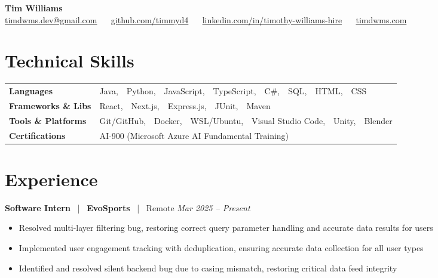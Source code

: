 \documentclass[10pt, letterpaper]{article}
\newcommand{\jobhead}[4]{%
  \vspace{5pt}%
  {\bfseries\color{dark}#1}%
  ~{\color{light}|}~%
  {\bfseries\color{navy}#2}%
  ~{\color{light}|}~%
  {\color{light}#3}%
  \hfill{\color{light}\small\textit{#4}}\\[-2pt]%
}
\newcommand{\skillrow}[2]{%
  {\bfseries #1} & #2 \\[2pt]%
}
\begin{document}

\begin{center}
  {\huge\bfseries\color{navy} Tim Williams}\\[4pt]
  {\small\color{light}
    \href{mailto:timdwms.dev@gmail.com}{timdwms.dev@gmail.com}
    ~\textbullet~
    \href{https://github.com/timmyd4}{github.com/timmyd4}
    ~\textbullet~
    \href{https://www.linkedin.com/in/timothy-williams-hire}{linkedin.com/in/timothy-williams-hire}
    ~\textbullet~
    \href{https://timdwms.com}{timdwms.com}
  }
\end{center}

\vspace{2pt}

\section{Technical Skills}

\begin{tabular}{@{}p{1.6in} p{5.2in}@{}}
  \skillrow{Languages}{Java,\ \ Python,\ \ JavaScript,\ \ TypeScript,\ \ C\#,\ \ SQL,\ \ HTML,\ \ CSS}
  \skillrow{Frameworks \& Libs}{React,\ \ Next.js,\ \ Express.js,\ \ JUnit,\ \ Maven}
  \skillrow{Tools \& Platforms}{Git/GitHub,\ \ Docker,\ \ WSL/Ubuntu,\ \ Visual Studio Code,\ \ Unity,\ \ Blender}
  \skillrow{Certifications}{AI-900 (Microsoft Azure AI Fundamental Training)}
\end{tabular}

\section{Experience}

\jobhead{Software Intern}{EvoSports}{Remote}{Mar 2025 – Present}
\begin{itemize}
  \item Resolved multi-layer filtering bug, restoring correct query parameter handling and accurate data results for users
  \item Implemented user engagement tracking with deduplication, ensuring accurate data collection for all user types
  \item Identified and resolved silent backend bug due to casing mismatch, restoring critical data feed integrity
\end{itemize}
\end{document}
